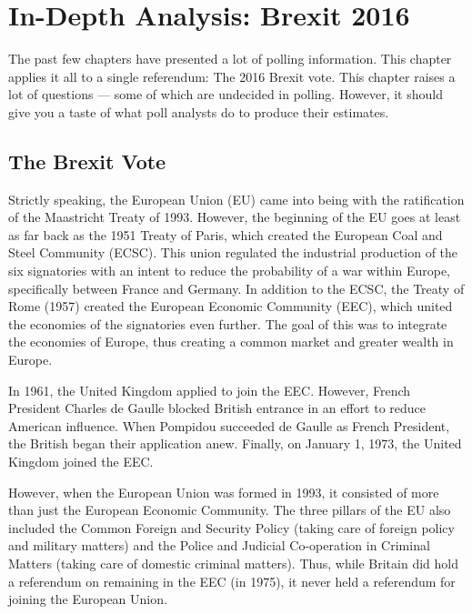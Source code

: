 \chapter{In-Depth Analysis: Brexit 2016}\label{ch:brexit}



\begin{extract}
The past few chapters have presented a lot of polling information. This chapter applies it all to a single referendum: The 2016 Brexit vote. This chapter raises a lot of questions --- some of which are undecided in polling. However, it should give you a taste of what poll analysts do to produce their estimates.
\end{extract}











\section*{The Brexit Vote}
Strictly speaking, the European Union (EU) came into being with the ratification of the Maastricht Treaty of 1993. However, the beginning of the EU goes at least as far back as the 1951 Treaty of Paris, which created the European Coal and Steel Community (ECSC). This union regulated the industrial production of the six signatories with an intent to reduce the probability of a war within Europe, specifically between France and Germany. In addition to the ECSC, the Treaty of Rome (1957) created the European Economic Community (EEC), which united the economies of the signatories even further. The goal of this was to integrate the economies of Europe, thus creating a common market and greater wealth in Europe.

In 1961, the United Kingdom applied to join the EEC. However, French President Charles de Gaulle blocked British entrance in an effort to reduce American influence. When Pompidou succeeded de Gaulle as French President, the British began their application anew. Finally, on January 1, 1973, the United Kingdom joined the EEC. 

However, when the European Union was formed in 1993, it consisted of more than just the European Economic Community. The three pillars of the EU also included the Common Foreign and Security Policy (taking care of foreign policy and military matters) and the Police and Judicial Co-operation in Criminal Matters (taking care of domestic criminal matters). Thus, while Britain did hold a referendum on remaining in the EEC (in 1975), it never held a referendum for joining the European Union. 

